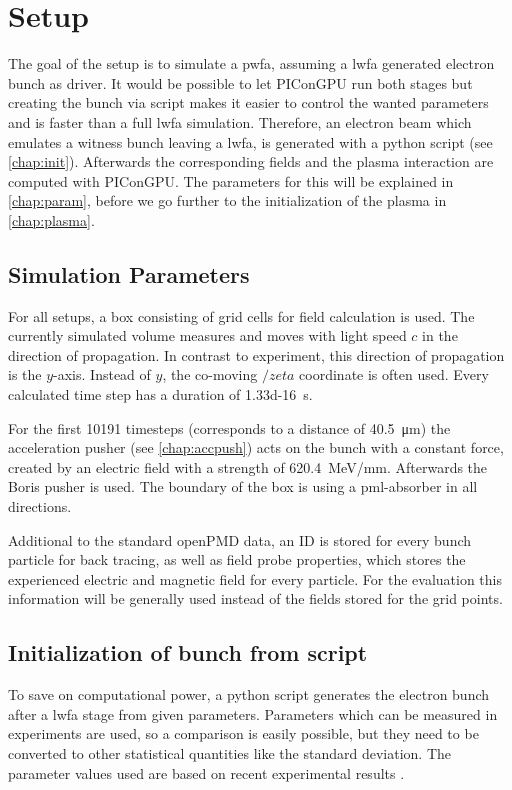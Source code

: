 \documentclass[bachelor_thesis]{subfiles}
\begin{document}
\chapter{Setup}\label{chap:setup}
The goal of the setup is to simulate a \gls{pwfa}, assuming a \gls{lwfa} generated electron bunch as driver. It would be possible to let PIConGPU run both stages but creating the bunch via script makes it easier to control the wanted parameters and is faster than a full \gls{lwfa} simulation.
Therefore, an electron beam which emulates a witness bunch leaving a \gls{lwfa}, is generated with a python script (see \autoref{chap:init}). Afterwards the corresponding fields and the plasma interaction are computed with PIConGPU. 
The parameters for this will  be explained in \autoref{chap:param}, before we go further to the initialization of the plasma in \autoref{chap:plasma}.


\section{Simulation Parameters}\label{chap:param}
For all setups, a box consisting of  grid cells for field calculation is used. The currently simulated volume measures  and moves with light speed $c$ in the direction of propagation.
In contrast to experiment, this direction of propagation is the $y$-axis. Instead of $y$, the co-moving $/zeta$ coordinate is often used.
Every calculated time step has a duration of \qty{1.33d-16}{\s}. 

For the first \num{10191} timesteps (corresponds to a distance of \qty{40.5}{\um}) the acceleration pusher (see \autoref{chap:accpush}) acts on the bunch with a constant force, 
created by an electric field with a strength of \qty{620.4}{\MeV/\mm}. Afterwards the Boris pusher is used. 
The boundary of the box is using a \gls{pml}-absorber in all directions. 

Additional to the standard openPMD data, an ID is stored for every bunch particle for back tracing, as well as field probe properties, which stores the experienced electric and magnetic field for every particle. 
For the evaluation this information will be generally used instead of the fields stored for the grid points.


\section{Initialization of bunch from script}\label{chap:init}
To save on computational power, a python script generates the electron bunch after a \gls{lwfa} stage from given parameters. Parameters which can be measured in experiments are used,
so a comparison is easily possible, but they need to be converted to other statistical quantities like the standard deviation. The parameter values used are based on recent experimental results \cite{Kurz2021, Schoebel2022, Cabadag2021}.
\end{document}

